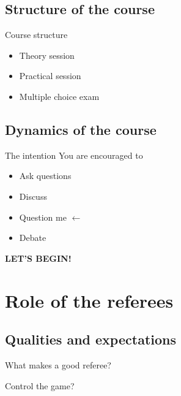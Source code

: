 \documentclass{beamer}
\begin{document}
    \subsection{Structure of the course}
    \begin{frame}{Course structure}
        \begin{itemize}
            \item Theory session \pause
            \item Practical session \pause
            \item Multiple choice exam
        \end{itemize}
    \end{frame}

    \subsection{Dynamics of the course}
    \begin{frame}{The intention}
        You are encouraged to
        \begin{itemize}
            \item Ask questions
            \item Discuss
            \item Question me $\leftarrow$
            \item Debate
        \end{itemize}

        \pause

        \begin{center}
            \textbf{\uppercase{Let's begin!}}
        \end{center}
    \end{frame}

    \section{Role of the referees}

    \subsection{Qualities and expectations}

    \begin{frame}{What makes a good referee?}
        \pause
        \begin{center}
            Control the game?
        \end{center}
    \end{frame}
\end{document}
